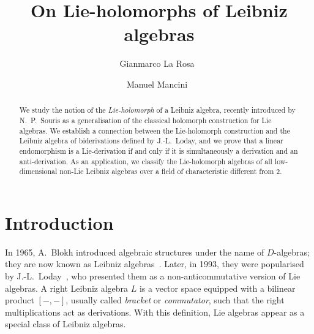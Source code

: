 \documentclass[11pt,a4paper]{amsart}
\date{}
\theoremstyle{plain}
\theoremstyle{definition}
\theoremstyle{remark}
\numberwithin{equation}{section}
\newcommand{\0}{\emptyset}
\begin{document}

\title[On Lie-holomorphs of Leibniz algebras]{On Lie-holomorphs of Leibniz algebras}

\author[G.~La Rosa]{Gianmarco La Rosa~}
\author[M.~Mancini]{Manuel Mancini~}


\address[G.~La Rosa, M.~Mancini]{Dipartimento di Matematica e Informatica, Università degli Studi di Palermo, via Archirafi 34, 90123 Palermo, Italy}

\address[M.~Mancini]{Institut de Recherche en Mathématique et Physique, Université catholique de Louvain, chemin du cyclotron 2 bte L7.01.02, B--1348 Louvain-la-Neuve, Belgium.}


\begin{abstract}
We study the notion of the \emph{Lie-holomorph} of a Leibniz algebra, recently introduced by N.~P.~Souris as a generalisation of the classical holomorph construction for Lie algebras. We establish a connection between the Lie-holomorph construction and the Leibniz algebra of biderivations defined by J.-L.~Loday, and we prove that a linear endomorphism is a Lie-derivation if and only if it is simultaneously a derivation and an anti-derivation. As an application, we classify the Lie-holomorph algebras of all low-dimensional non-Lie Leibniz algebras over a field of characteristic different from $2$.
\end{abstract}


\maketitle

\section{Introduction}
In 1965, A.~Blokh introduced algebraic structures under the name of $D$-algebras; they are now known as Leibniz algebras~\cite{blokhLie1965}. Later, in 1993, they were popularised by J.-L.~Loday~\cite{loday1993}, who presented them as a non-anticommutative version of Lie algebras. A right Leibniz algebra $L$ is a vector space equipped with a bilinear product $[-,-]$, usually called \emph{bracket} or \emph{commutator}, such that the right multiplications act as derivations. With this definition, Lie algebras appear as a special class of Leibniz algebras.
\end{document}
